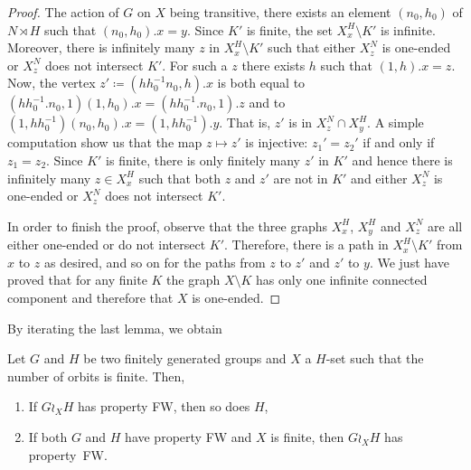 \begin{proof}
The action of $G$ on $X$ being transitive, there exists an element $(n_0,h_0)$ of $N \rtimes H$ such that $(n_0,h_0).x = y$.
Since $K'$ is finite, the set $X_x^H\setminus K'$ is infinite.
Moreover, there is infinitely many $z$ in $X_x^H\setminus K'$ such that either $X_z^N$ is one-ended or $X_z^N$ does not intersect $K'$.
For such a $z$ there exists $h$ such that $(1,h).x=z$.
Now, the vertex $z'\coloneqq(hh_0^{-1}n_0,h).x$ is both equal to $(hh_0^{-1}.n_0,1)(1,h_0).x=(hh_0^{-1}.n_0,1).z$ and to $(1,hh_0^{-1})(n_0,h_0).x=(1,hh_0^{-1}).y$. That is, $z'$ is in $X_z^N\cap X_y^H$.
A simple computation show us that the map $z\mapsto z'$ is injective: $z_1'=z_2'$ if and only if $z_1=z_2$.
Since $K'$ is finite, there is only finitely many $z'$ in $K'$ and hence there is infinitely many $z\in X_x^H$ such that both $z$ and $z'$ are not in $K'$ and either $X_z^N$ is one-ended or $X_z^N$ does not intersect $K'$.

In order to finish the proof, observe that the three graphs $X_x^H$, $X_y^H$ and $X_z^N$ are all either one-ended or do not intersect $K'$.
Therefore, there is a path in $X_x^H\setminus K'$ from $x$ to $z$ as desired, and so on for the paths from $z$ to $z'$ and $z'$ to $y$.
We just have proved that for any finite $K$ the graph $X\setminus K$ has only one infinite connected component and therefore that $X$ is one-ended.
%
%
%
%
%
\end{proof}

By iterating the last lemma, we obtain
%
%
\begin{cor}\label{Cor:Wreath_ends}
Let $G$ and $H$ be two finitely generated groups and $X$ a $H$-set such that the number of orbits is finite. Then,
\begin{enumerate}
\item
If $G\wr_X H$ has property FW, then so does $H$,
\item
If both $G$ and $H$ have property FW and $X$ is finite, then $G\wr_X H$ has property~FW.
\end{enumerate}
\end{cor}
%
%

